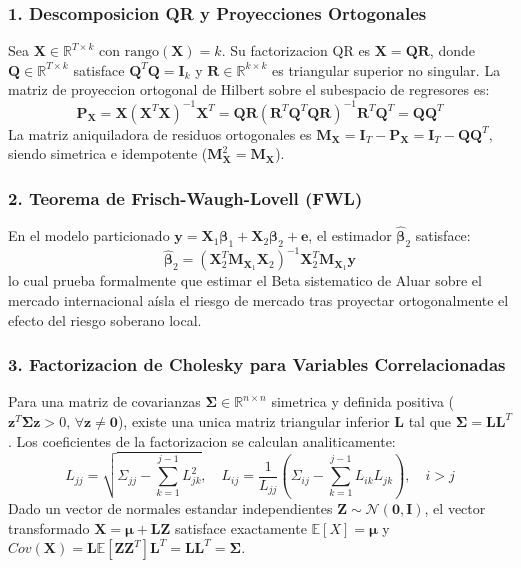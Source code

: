 \documentclass[10pt,a4paper]{article}
\theoremstyle{definition}
\begin{document}
\subsubsection{1. Descomposicion QR y Proyecciones Ortogonales}
Sea $\mathbf{X} \in \mathbb{R}^{T \times k}$ con $\text{rango}(\mathbf{X}) = k$. Su factorizacion QR es $\mathbf{X} = \mathbf{Q}\mathbf{R}$, donde $\mathbf{Q} \in \mathbb{R}^{T \times k}$ satisface $\mathbf{Q}^T\mathbf{Q} = \mathbf{I}_k$ y $\mathbf{R} \in \mathbb{R}^{k \times k}$ es triangular superior no singular.
La matriz de proyeccion ortogonal de Hilbert sobre el subespacio de regresores es:
\begin{equation}
\mathbf{P}_{\mathbf{X}} = \mathbf{X}(\mathbf{X}^T\mathbf{X})^{-1}\mathbf{X}^T = \mathbf{Q}\mathbf{R}(\mathbf{R}^T\mathbf{Q}^T\mathbf{Q}\mathbf{R})^{-1}\mathbf{R}^T\mathbf{Q}^T = \mathbf{Q}\mathbf{Q}^T
\end{equation}
La matriz aniquiladora de residuos ortogonales es $\mathbf{M}_{\mathbf{X}} = \mathbf{I}_T - \mathbf{P}_{\mathbf{X}} = \mathbf{I}_T - \mathbf{Q}\mathbf{Q}^T$, siendo simetrica e idempotente ($\mathbf{M}_{\mathbf{X}}^2 = \mathbf{M}_{\mathbf{X}}$).

\subsubsection{2. Teorema de Frisch-Waugh-Lovell (FWL)}
En el modelo particionado $\mathbf{y} = \mathbf{X}_1 \boldsymbol{\beta}_1 + \mathbf{X}_2 \boldsymbol{\beta}_2 + \mathbf{e}$, el estimador $\hat{\boldsymbol{\beta}}_2$ satisface:
\begin{equation}
\hat{\boldsymbol{\beta}}_2 = (\mathbf{X}_2^T \mathbf{M}_{\mathbf{X}_1} \mathbf{X}_2)^{-1} \mathbf{X}_2^T \mathbf{M}_{\mathbf{X}_1} \mathbf{y}
\end{equation}
lo cual prueba formalmente que estimar el Beta sistematico de Aluar sobre el mercado internacional aísla el riesgo de mercado tras proyectar ortogonalmente el efecto del riesgo soberano local.

\subsubsection{3. Factorizacion de Cholesky para Variables Correlacionadas}
Para una matriz de covarianzas $\mathbf{\Sigma} \in \mathbb{R}^{n \times n}$ simetrica y definida positiva ($\mathbf{z}^T \mathbf{\Sigma} \mathbf{z} > 0, \, \forall \mathbf{z} \ne \mathbf{0}$), existe una unica matriz triangular inferior $\mathbf{L}$ tal que $\mathbf{\Sigma} = \mathbf{L}\mathbf{L}^T$.
Los coeficientes de la factorizacion se calculan analiticamente:
\begin{equation}
L_{jj} = \sqrt{\Sigma_{jj} - \sum_{k=1}^{j-1} L_{jk}^2}, \quad L_{ij} = \frac{1}{L_{jj}} \left( \Sigma_{ij} - \sum_{k=1}^{j-1} L_{ik}L_{jk} \right), \quad i > j
\end{equation}
Dado un vector de normales estandar independientes $\mathbf{Z} \sim \mathcal{N}(\mathbf{0}, \mathbf{I})$, el vector transformado $\mathbf{X} = \mathbf{\mu} + \mathbf{L}\mathbf{Z}$ satisface exactamente $\mathbb{E}[X] = \boldsymbol{\mu}$ y $Cov(\mathbf{X}) = \mathbf{L} \mathbb{E}[\mathbf{Z}\mathbf{Z}^T] \mathbf{L}^T = \mathbf{L}\mathbf{L}^T = \mathbf{\Sigma}$.
\end{document}
